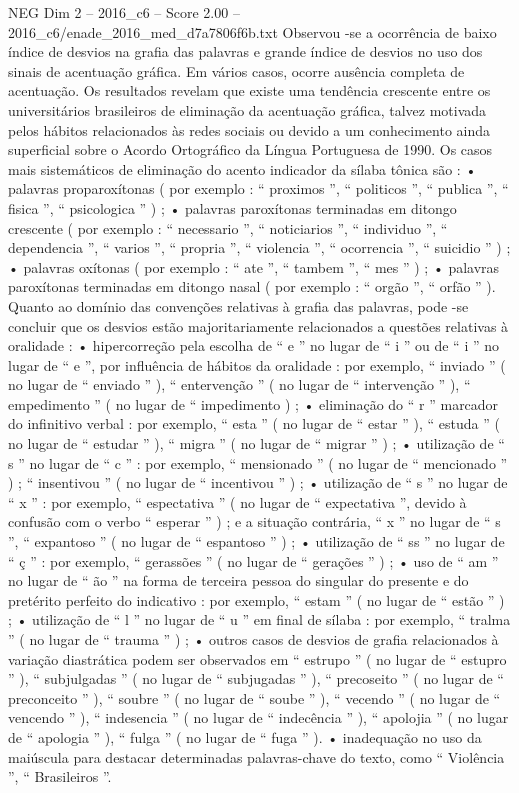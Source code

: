 \begin{textsample}{NEG Dim 2 – 2016\_c6 – Score 2.00 – 2016\_c6/enade\_2016\_med\_d7a7806f6b.txt}
Observou -se a ocorrência de baixo índice de desvios na grafia das palavras e grande índice de desvios no uso dos sinais de acentuação gráfica.
Em vários casos, ocorre ausência completa de acentuação.
Os resultados revelam que existe uma tendência crescente entre os universitários brasileiros de eliminação da acentuação gráfica, talvez motivada pelos hábitos relacionados às redes sociais ou devido a um conhecimento ainda superficial sobre o Acordo Ortográfico da Língua Portuguesa de 1990.
Os casos mais sistemáticos de eliminação do acento indicador da sílaba tônica são : • palavras proparoxítonas ( por exemplo : “ proximos ”, “ politicos ”, “ publica ”, “ fisica ”, “ psicologica ” ) ; • palavras paroxítonas terminadas em ditongo crescente ( por exemplo : “ necessario ”, “ noticiarios ”, “ individuo ”, “ dependencia ”, “ varios ”, “ propria ”, “ violencia ”, “ ocorrencia ”, “ suicidio ” ) ; • palavras oxítonas ( por exemplo : “ ate ”, “ tambem ”, “ mes ” ) ; • palavras paroxítonas terminadas em ditongo nasal ( por exemplo : “ orgão ”, “ orfão ” ).
Quanto ao domínio das convenções relativas à grafia das palavras, pode -se concluir que os desvios estão majoritariamente relacionados a questões relativas à oralidade : • hipercorreção pela escolha de “ e ” no lugar de “ i ” ou de “ i ” no lugar de “ e ”, por influência de hábitos da oralidade : por exemplo, “ inviado ” ( no lugar de “ enviado ” ), “ entervenção ” ( no lugar de “ intervenção ” ), “ empedimento ” ( no lugar de “ impedimento ) ; • eliminação do “ r ” marcador do infinitivo verbal : por exemplo, “ esta ” ( no lugar de “ estar ” ), “ estuda ” ( no lugar de “ estudar ” ), “ migra ” ( no lugar de “ migrar ” ) ; • utilização de “ s ” no lugar de “ c ” : por exemplo, “ mensionado ” ( no lugar de “ mencionado ” ) ; “ insentivou ” ( no lugar de “ incentivou ” ) ; • utilização de “ s ” no lugar de “ x ” : por exemplo, “ espectativa ” ( no lugar de “ expectativa ”, devido à confusão com o verbo “ esperar ” ) ; e a situação contrária, “ x ” no lugar de “ s ”, “ expantoso ” ( no lugar de “ espantoso ” ) ; • utilização de “ ss ” no lugar de “ ç ” : por exemplo, “ gerassões ” ( no lugar de “ gerações ” ) ; • uso de “ am ” no lugar de “ ão ” na forma de terceira pessoa do singular do presente e do pretérito perfeito do indicativo : por exemplo, “ estam ” ( no lugar de “ estão ” ) ; • utilização de “ l ” no lugar de “ u ” em final de sílaba : por exemplo, “ tralma ” ( no lugar de “ trauma ” ) ; • outros casos de desvios de grafia relacionados à variação diastrática podem ser observados em “ estrupo ” ( no lugar de “ estupro ” ), “ subjulgadas ” ( no lugar de “ subjugadas ” ), “ precoseito ” ( no lugar de “ preconceito ” ), “ soubre ” ( no lugar de “ soube ” ), “ vecendo ” ( no lugar de “ vencendo ” ), “ indesencia ” ( no lugar de “ indecência ” ), “ apolojia ” ( no lugar de “ apologia ” ), “ fulga ” ( no lugar de “ fuga ” ). • inadequação no uso da maiúscula para destacar determinadas palavras-chave do texto, como “ Violência ”, “ Brasileiros ”.

\end{textsample}
